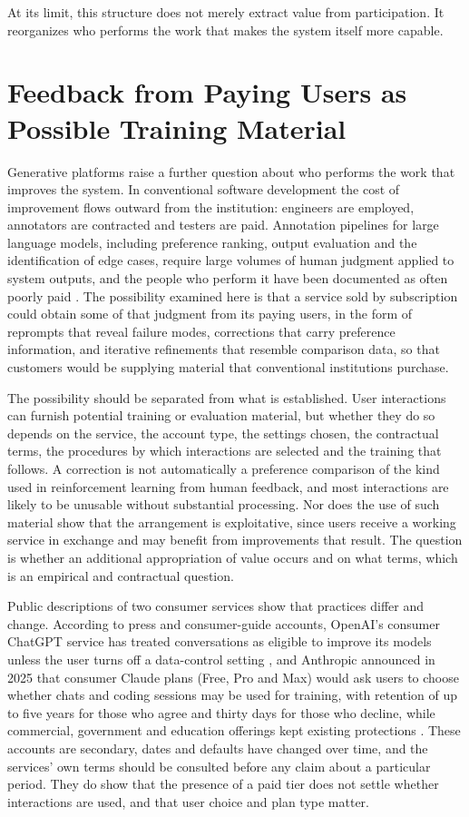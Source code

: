 \documentclass[12pt, a4paper]{article}
\begin{document}
At its limit, this structure does not merely extract value from participation. It reorganizes who performs the work that makes the system itself more capable.


\section{Feedback from Paying Users as Possible Training Material}
\label{sec:labor}

Generative platforms raise a further question about who performs the work that improves the system. In conventional software development the cost of improvement flows outward from the institution: engineers are employed, annotators are contracted and testers are paid. Annotation pipelines for large language models, including preference ranking, output evaluation and the identification of edge cases, require large volumes of human judgment applied to system outputs, and the people who perform it have been documented as often poorly paid \citep{gray2019,ouyang2022}. The possibility examined here is that a service sold by subscription could obtain some of that judgment from its paying users, in the form of reprompts that reveal failure modes, corrections that carry preference information, and iterative refinements that resemble comparison data, so that customers would be supplying material that conventional institutions purchase.

The possibility should be separated from what is established. User interactions can furnish potential training or evaluation material, but whether they do so depends on the service, the account type, the settings chosen, the contractual terms, the procedures by which interactions are selected and the training that follows. A correction is not automatically a preference comparison of the kind used in reinforcement learning from human feedback, and most interactions are likely to be unusable without substantial processing. Nor does the use of such material show that the arrangement is exploitative, since users receive a working service in exchange and may benefit from improvements that result. The question is whether an additional appropriation of value occurs and on what terms, which is an empirical and contractual question.

Public descriptions of two consumer services show that practices differ and change. According to press and consumer-guide accounts, OpenAI's consumer ChatGPT service has treated conversations as eligible to improve its models unless the user turns off a data-control setting \citep{TomsGuideChatGPT}, and Anthropic announced in 2025 that consumer Claude plans (Free, Pro and Max) would ask users to choose whether chats and coding sessions may be used for training, with retention of up to five years for those who agree and thirty days for those who decline, while commercial, government and education offerings kept existing protections \citep{BitdefenderAnthropic}. These accounts are secondary, dates and defaults have changed over time, and the services' own terms should be consulted before any claim about a particular period. They do show that the presence of a paid tier does not settle whether interactions are used, and that user choice and plan type matter.
\end{document}
